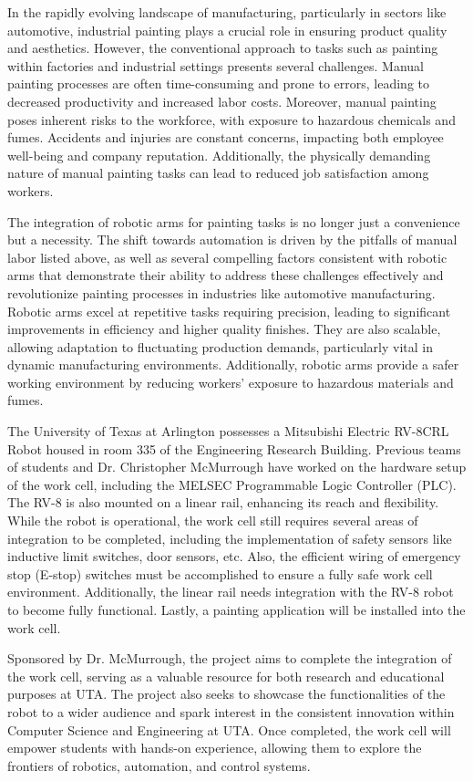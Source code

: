 In the rapidly evolving landscape of manufacturing, particularly in sectors like automotive, industrial painting plays a crucial role in ensuring product quality and aesthetics. However, the conventional approach to tasks such as painting within factories and industrial settings presents several challenges. Manual painting processes are often time-consuming and prone to errors, leading to decreased productivity and increased labor costs. Moreover, manual painting poses inherent risks to the workforce, with exposure to hazardous chemicals and fumes. Accidents and injuries are constant concerns, impacting both employee well-being and company reputation. Additionally, the physically demanding nature of manual painting tasks can lead to reduced job satisfaction among workers.

The integration of robotic arms for painting tasks is no longer just a convenience but a necessity. The shift towards automation is driven by the pitfalls of manual labor listed above, as well as several compelling factors consistent with robotic arms that demonstrate their ability to address these challenges effectively and revolutionize painting processes in industries like automotive manufacturing. Robotic arms excel at repetitive tasks requiring precision, leading to significant improvements in efficiency and higher quality finishes. They are also scalable, allowing adaptation to fluctuating production demands, particularly vital in dynamic manufacturing environments. Additionally, robotic arms provide a safer working environment by reducing workers' exposure to hazardous materials and fumes.

The University of Texas at Arlington possesses a Mitsubishi Electric RV-8CRL Robot housed in room 335 of the Engineering Research Building. Previous teams of students and Dr. Christopher McMurrough have worked on the hardware setup of the work cell, including the MELSEC Programmable Logic Controller (PLC). The RV-8 is also mounted on a linear rail, enhancing its reach and flexibility. While the robot is operational, the work cell still requires several areas of integration to be completed, including the implementation of safety sensors like inductive limit switches, door sensors, etc. Also, the efficient wiring of emergency stop (E-stop) switches must be accomplished to ensure a fully safe work cell environment. Additionally, the linear rail needs integration with the RV-8 robot to become fully functional. Lastly, a painting application will be installed into the work cell.

Sponsored by Dr. McMurrough, the project aims to complete the integration of the work cell, serving as a valuable resource for both research and educational purposes at UTA. The project also seeks to showcase the functionalities of the robot to a wider audience and spark interest in the consistent innovation within Computer Science and Engineering at UTA. Once completed, the work cell will empower students with hands-on experience, allowing them to explore the frontiers of robotics, automation, and control systems.